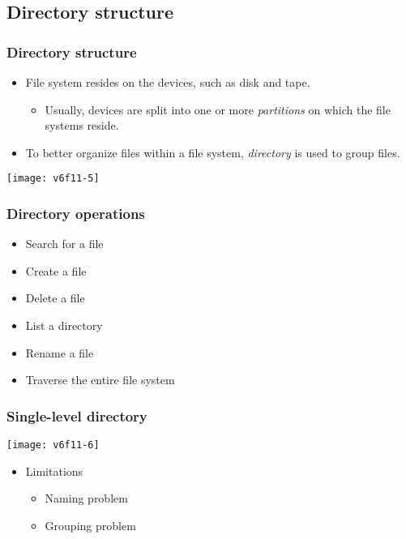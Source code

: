 \documentclass[CJKutf8,dvipsnames,table]{beamer}
\begin{document}
\begin{CJK*}{UTF8}{song}
  \subsection{Directory structure}

  \begin{frame}
    \frametitle{Directory structure} \pause
    \begin{itemize}
    \item File system resides on the devices, such as disk and tape. \pause
      \begin{itemize}
      \item Usually, devices are split into one or more \emph{partitions} on which the file systems reside. \pause
      \end{itemize}
    \item To better organize files within a file system, \emph{directory} is used to group files. \pause
    \end{itemize}
    \begin{center}
      \texttt{[image: v6f11-5]}
    \end{center}
  \end{frame}

  \begin{frame}
    \frametitle{Directory operations} \pause
    \begin{itemize}
    \item Search for a file \pause
    \item Create a file \pause
    \item Delete a file \pause
    \item List a directory \pause
    \item Rename a file \pause
    \item Traverse the entire file system
    \end{itemize}
  \end{frame}

  \begin{frame}
    \frametitle{Single-level directory} \pause
    \begin{center}
      \texttt{[image: v6f11-6]} \pause
    \end{center}
    \begin{itemize}
    \item Limitations \pause
      \begin{itemize}
      \item Naming problem \pause
      \item Grouping problem
      \end{itemize}
    \end{itemize}
  \end{frame}


\end{CJK*}
\end{document}
